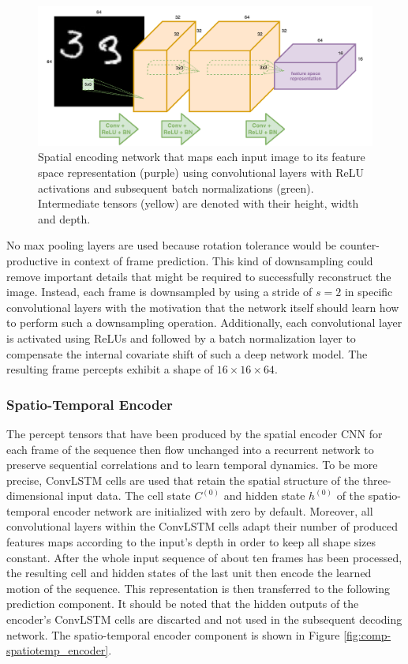 \begin{figure}[htb]
	\centering
	\includegraphics[width=0.9\linewidth]{figures/comp_spatial_encoder.pdf} 
	\caption[Spatial Encoder Component]{Spatial encoding network that maps each input image to its feature space representation (purple) using convolutional layers with ReLU activations and subsequent batch normalizations (green). Intermediate tensors (yellow) are denoted with their height, width and depth.} \label{fig:comp-spatial_encoder}
\end{figure}

No max pooling layers are used because rotation tolerance would be counter-productive in context of frame prediction. This kind of downsampling could remove important details that might be required to successfully reconstruct the image. Instead, each frame is downsampled by using a stride of $ s=2 $ in specific convolutional layers with the motivation that the network itself should learn how to perform such a downsampling operation. Additionally, each convolutional layer is activated using ReLUs and followed by a batch normalization layer to compensate the internal covariate shift of such a deep network model. The resulting frame percepts exhibit a shape of $16\times16\times64$.

\subsubsection{Spatio-Temporal Encoder}

The percept tensors that have been produced by the spatial encoder CNN for each frame of the sequence then flow unchanged into a recurrent network to preserve sequential correlations and to learn temporal dynamics. To be more precise, ConvLSTM cells are used that retain the spatial structure of the three-dimensional input data. The cell state $C^{(0)}$ and hidden state $h^{(0)}$ of the spatio-temporal encoder network are initialized with zero by default. Moreover, all convolutional layers within the ConvLSTM cells adapt their number of produced features maps according to the input's depth in order to keep all shape sizes constant. After the whole input sequence of about ten frames has been processed, the resulting cell and hidden states of the last unit then encode the learned motion of the sequence. This representation is then transferred to the following prediction component. It should be noted that the hidden outputs of the encoder's ConvLSTM cells are discarted and not used in the subsequent decoding network. The spatio-temporal encoder component is shown in Figure \ref{fig:comp-spatiotemp_encoder}.

